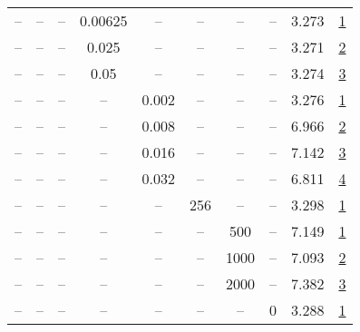 \begin{table}[H]
\begin{tabular}{cccccccccc}
-- & -- & -- & 0.00625 & -- & -- & -- & -- & 3.273 & \href{https://wandb.ai/stanford-mercury/optimizer-scaling/runs/sweep-300m-6B-sophiaf1c8974lr0.004-wd0.1-minlr0-warmup4000-b10.9-61cb81}{1} \\
-- & -- & -- & 0.025 & -- & -- & -- & -- & 3.271 & \href{https://wandb.ai/stanford-mercury/optimizer-scaling/runs/sweep-300m-6B-sophia0bdec2lr0.004-wd0.1-minlr0-warmup4000-b10.9--3e79ae}{2} \\
-- & -- & -- & 0.05 & -- & -- & -- & -- & 3.274 & \href{https://wandb.ai/stanford-mercury/optimizer-scaling/runs/sweep-300m-6B-sophiafb81f4clr0.004-wd0.1-minlr0-warmup4000-b10.9-d0e589}{3} \\
-- & -- & -- & -- & 0.002 & -- & -- & -- & 3.276 & \href{https://wandb.ai/stanford-mercury/optimizer-scaling/runs/sweep-300m-6B-sophiaf48caf2lr0.002-wd0.1-minlr0-warmup4000-b10.9-419131}{1} \\
-- & -- & -- & -- & 0.008 & -- & -- & -- & 6.966 & \href{https://wandb.ai/stanford-mercury/optimizer-scaling/runs/sweep-300m-6B-sophiaf7ddcdelr0.008-wd0.1-minlr0-warmup4000-b10.9-c2af56}{2} \\
-- & -- & -- & -- & 0.016 & -- & -- & -- & 7.142 & \href{https://wandb.ai/stanford-mercury/optimizer-scaling/runs/sweep-300m-6B-sophia65eca1lr0.016-wd0.1-minlr0-warmup4000-b10.9--549c14}{3} \\
-- & -- & -- & -- & 0.032 & -- & -- & -- & 6.811 & \href{https://wandb.ai/stanford-mercury/optimizer-scaling/runs/sweep-300m-6B-sophiaf839d52lr0.032-wd0.1-minlr0-warmup4000-b10.9-48299d}{4} \\
-- & -- & -- & -- & -- & 256 & -- & -- & 3.298 & \href{https://wandb.ai/stanford-mercury/optimizer-scaling/runs/sweep-300m-6B-sophiafa82475lr0.004-wd0.1-minlr0-warmup4000-b10.9-fdbea7}{1} \\
-- & -- & -- & -- & -- & -- & 500 & -- & 7.149 & \href{https://wandb.ai/stanford-mercury/optimizer-scaling/runs/sweep-300m-6B-sophia5bfed8lr0.004-wd0.1-minlr0-warmup500-b10.9-b-c70282}{1} \\
-- & -- & -- & -- & -- & -- & 1000 & -- & 7.093 & \href{https://wandb.ai/stanford-mercury/optimizer-scaling/runs/sweep-300m-6B-sophiaq10b06blr0.004-wd0.1-minlr0-warmup1000-b10.9-64a74d}{2} \\
-- & -- & -- & -- & -- & -- & 2000 & -- & 7.382 & \href{https://wandb.ai/stanford-mercury/optimizer-scaling/runs/sweep-300m-6B-sophia5959balr0.004-wd0.1-minlr0-warmup2000-b10.9--480e3d}{3} \\
-- & -- & -- & -- & -- & -- & -- & 0 & 3.288 & \href{https://wandb.ai/stanford-mercury/optimizer-scaling/runs/sweep-300m-6B-sophiad11a0flr0.004-wd0-minlr0-warmup4000-b10.9-b2-ca019c}{1} \\

\end{tabular}
\end{table}
